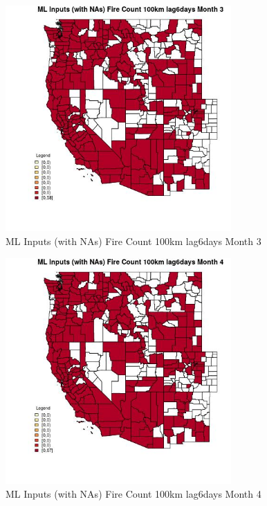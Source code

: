 \begin{figure} 
\centering  
\includegraphics[width=0.77\textwidth]{Code_Outputs/Report_ML_input_PM25_Step4_part_e_de_duplicated_aves_compiled_2019-05-21wNAs_CountyFire_Count_100km_lag6daysmedianMonth3.jpg} 
\caption{\label{fig:Report_ML_input_PM25_Step4_part_e_de_duplicated_aves_compiled_2019-05-21wNAsCountyFire_Count_100km_lag6daysmedianMonth3}ML Inputs (with NAs) Fire Count 100km lag6days Month 3} 
\end{figure} 
 

\begin{figure} 
\centering  
\includegraphics[width=0.77\textwidth]{Code_Outputs/Report_ML_input_PM25_Step4_part_e_de_duplicated_aves_compiled_2019-05-21wNAs_CountyFire_Count_100km_lag6daysmedianMonth4.jpg} 
\caption{\label{fig:Report_ML_input_PM25_Step4_part_e_de_duplicated_aves_compiled_2019-05-21wNAsCountyFire_Count_100km_lag6daysmedianMonth4}ML Inputs (with NAs) Fire Count 100km lag6days Month 4} 
\end{figure} 
 

